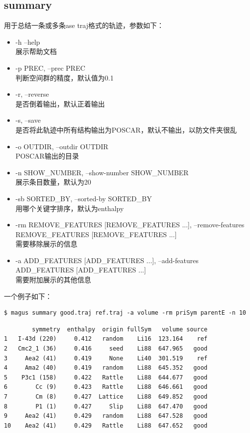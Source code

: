 \documentclass[12pt]{article}
\begin{document}
\subsection{summary} \label{summary}
用于总结一条或多条ase traj格式的轨迹，参数如下：
\begin{itemize}
    \item -h --help \\
    展示帮助文档
    \item -p PREC, --prec PREC  \\
    判断空间群的精度，默认值为0.1
    \item -r, --reverse     \\    
    是否倒着输出，默认正着输出
    \item -s, --save \\ 
    是否将此轨迹中所有结构输出为POSCAR，默认不输出，以防文件夹很乱
    \item -o OUTDIR, --outdir OUTDIR\\
    POSCAR输出的目录
    \item  -n SHOW\_NUMBER, --show-number SHOW\_NUMBER \\
    展示条目数量，默认为20
    \item  -sb SORTED\_BY, --sorted-by SORTED\_BY\\
    用哪个关键字排序，默认为enthalpy
    \item -rm REMOVE\_FEATURES [REMOVE\_FEATURES ...], 
    --remove-features REMOVE\_FEATURES [REMOVE\_FEATURES ...]\\
    需要移除展示的信息
    \item -a ADD\_FEATURES [ADD\_FEATURES ...], 
    --add-features ADD\_FEATURES [ADD\_FEATURES ...]\\
    需要附加展示的其他信息
\end{itemize}
一个例子如下：
\begin{tcolorbox}
    \begin{verbatim} 
$ magus summary good.traj ref.traj -a volume -rm priSym parentE -n 10
    \end{verbatim}
\tcblower
\begin{verbatim} 
        symmetry  enthalpy  origin fullSym   volume source
1   I-43d (220)     0.412   random    Li16  123.164    ref
2   Cmc2_1 (36)     0.416     seed    Li88  647.965   good
3     Aea2 (41)     0.419     None    Li40  301.519    ref
4     Ama2 (40)     0.419   random    Li88  645.352   good
5    P3c1 (158)     0.422   Rattle    Li88  644.677   good
6        Cc (9)     0.423   Rattle    Li88  646.661   good
7        Cm (8)     0.427  Lattice    Li88  649.852   good
8        P1 (1)     0.427     Slip    Li88  647.470   good
9     Aea2 (41)     0.429   random    Li88  647.528   good
10    Aea2 (41)     0.429   Rattle    Li88  647.652   good
\end{verbatim} 
\end{tcolorbox}
\end{document}
